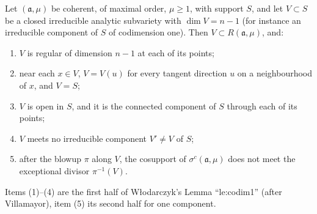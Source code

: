 \begin{theorem}
\label{bcalc:codim-one-components}
\upstreamleanok
Let \((\mathfrak a,\mu)\) be coherent, of maximal order, \(\mu\ge1\), with support \(S\), and let \(V\subset S\) be a closed irreducible analytic subvariety
with \(\dim V=n-1\) (for instance an irreducible component of \(S\) of codimension one). Then \(V\subset R(\mathfrak a,\mu)\), and:
\begin{enumerate}
\item \(V\) is regular of dimension \(n-1\) at each of its points;
\item near each \(x\in V\), \(V=V(u)\) for every tangent direction \(u\) on a neighbourhood of \(x\), and \(V=S\);
\item \(V\) is open in \(S\), and it is the connected component of \(S\) through each of its points;
\item \(V\) meets no irreducible component \(V'\neq V\) of \(S\);
\item after the blowup \(\pi\) along \(V\), the cosupport of \(\sigma^{c}(\mathfrak a,\mu)\) does not meet the exceptional divisor \(\pi^{-1}(V)\).
\end{enumerate}
Items (1)--(4) are the first half of Włodarczyk's Lemma ``le:codim1'' (after Villamayor), item (5) its second half for one component.
\end{theorem}
